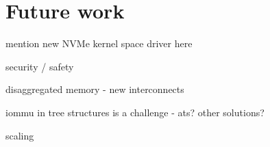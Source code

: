 \section{Future work}\label{sec:fw}

mention new NVMe kernel space driver here

security / safety

disaggregated memory - new interconnects

iommu in tree structures is a challenge - ats? other solutions?


scaling





%
%
